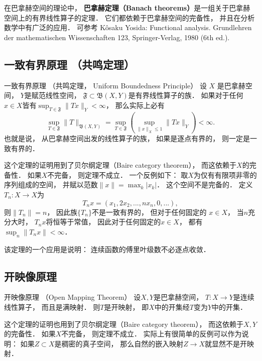 

在巴拿赫空间的理论中， \textbf{巴拿赫定理（Banach theorems）}是一组关于巴拿赫空间上的有界线性算子的定理． 它们都依赖于巴拿赫空间的完备性， 并且在分析数学中有广泛的应用． 可参考 Kôsaku Yosida: Functional analysis. Grundlehren der mathematischen Wissenschaften 123, Springer-Verlag, 1980 (6th ed.).

\subsection{一致有界原理 （共鸣定理）}
\begin{theorem}{一致有界原理 （共鸣定理， Uniform Boundedness Principle）}
设 $X$ 是巴拿赫空间， $Y$是赋范线性空间， $\mathfrak{F}\subset\mathfrak{B}(X,Y)$是有界线性算子的族． 如果对于任何$x\in X$皆有$\sup_{T\in\mathfrak{F}}\|Tx\|_Y<\infty$， 那么实际上必有
$$
\sup_{T\in\mathfrak{F}}\|T\|_{\mathfrak{B}(X,Y)}
=\sup_{T\in\mathfrak{F}}\left(\sup_{\|x\|_X\leq 1}\|Tx\|_Y\right)<\infty.
$$
也就是说， 从巴拿赫空间出发的线性算子的族， 如果是逐点有界的， 则一定是一致有界的． 
\end{theorem}
这个定理的证明用到了贝尔纲定理（Baire category theorem）， 而这依赖于$X$的完备性． 如果$X$不完备， 则定理不成立． 一个反例如下： 取$X$为仅有有限项非零的序列组成的空间， 并赋以范数$\|x\|=\max_{k}|x_k|$． 这个空间不是完备的． 定义$T_n:X\to X$为
$$
T_nx=(x_1,2x_2,...,nx_n,0,...),
$$
则$\|T_n\|=n$， 因此族$\{T_n\}$不是一致有界的， 但对于任何固定的 $x\in X$， 当$n$充分大时， $T_nx$将恒等于常值， 因此对于任何固定的$x\in X$， 都有$\sup_n\|T_nx\|<\infty$．

该定理的一个应用是说明： 连续函数的傅里叶级数不必逐点收敛． 

\subsection{开映像原理}
\begin{theorem}{开映像原理 （Open Mapping Theorem）}
设$X,Y$是巴拿赫空间， $T:X\to Y$是连续线性算子， 而且是满映射． 则$T$是开映射， 即$X$中的开集经$T$变为$Y$中的开集．
\end{theorem}

这个定理的证明也用到了贝尔纲定理（Baire category theorem）， 而这依赖于$X,Y$的完备性． 如果$X$不完备， 则定理不成立． 实际上有很简单的反例可以作为说明： 如果$Z\subset X$是稠密的真子空间， 那么自然的嵌入映射$Z\to X$就显然不是开映射．

